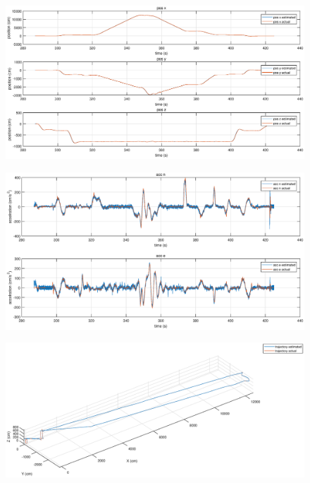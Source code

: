 \documentclass[
  type=master
]{gdutthesis}
\begin{document}
\begin{figure}[H]
	\centering
	\includegraphics[width=1.0\textwidth]{position.eps}
	\label{fig:position}
\end{figure}

\begin{figure}[H]
	\centering
	\includegraphics[width=1.0\textwidth]{motionacc.eps}
	\label{fig:motionacc}
\end{figure}

\begin{figure}[H]
	\centering
	\includegraphics[width=1.0\textwidth]{trajectory.eps}
	\label{fig:trajectory}
\end{figure}
\end{document}
